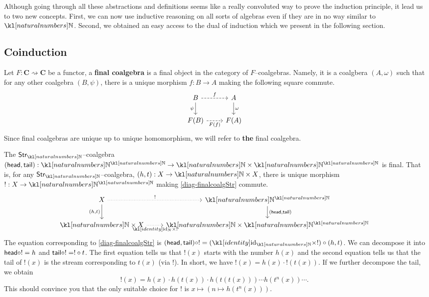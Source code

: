 \documentclass[main.tex]{subfiles}
\begin{document}
Although going through all these abstractions and definitions seems like a really convoluted way to prove the induction principle, it lead us to two new concepts. First, we can now use inductive reasoning on all sorts of algebras even if they are in no way similar to $\N$. Second, we obtained an easy access to the dual of induction which we present in the following section.

\subsection{Coinduction}
\begin{defn}
	Let $F:\mathbf{C}\rightsquigarrow \mathbf{C}$ be a functor, a \textbf{final coalgebra} is a final object in the category of $F$--coalgebras. Namely, it is a coalgbera $(A, \omega)$ such that for any other coalgebra $(B, \psi)$, there is a unique morphism $f: B\rightarrow A$ making the following square commute.
	\begin{equation}\label{diag-fincoalg}
	\centering
	\begin{tikzcd}
	B \arrow[d, "\psi"'] \arrow[r, dashed, "f"] & A \arrow[d, "\omega"] \\
	F(B) \arrow[r, dashed, "F(f)"']                           & F(A)                       
	\end{tikzcd}
    \end{equation}
    Since final coalgebras are unique up to unique homomorphism, we will refer to \textbf{the} final coalgebra.
\end{defn}
\begin{exmp}\label{exmp-finalcoalgStr}
    The $\Str_{\N}$--coalgebra $(\head,\tail): \N^{\N} \rightarrow \N \times \N^{\N}$ is final. That is, for any $\Str_{\N}$--coalgebra, $(h,t): X \rightarrow \N \times X$, there is unique morphism $!:X \rightarrow \N^{\N}$ making \eqref{diag-finalcoalgStr} commute.
    \begin{equation}\label{diag-finalcoalgStr}
        \begin{tikzcd}
            X \arrow[d, "{(h,t)}"'] \arrow[r, "!", dotted]  & \N^{\N} \arrow[d, "{(\head,\tail)}"] \\
            \N\times X \arrow[r, "\id_N \times !"', dotted] & \N \times \N^{\N}                   
        \end{tikzcd}
    \end{equation}
    The equation corresponding to \eqref{diag-finalcoalgStr} is $(\head, \tail) \circ ! = (\id_{\N} \times !) \circ (h,t)$. We can decompose it into $\textsf{head} \circ ! = h$ and $\textsf{tail} \circ ! = ! \circ t$. The first equation tells us that $!(x)$ starts with the number $h(x)$ and the second equation tells us that the tail of $!(x)$ is the stream corresponding to $t(x)$ (via $!$). In short, we have $!(x) = h(x) \cdot !(t(x))$. If we further decompose the tail, we obtain
    \[!(x) = h(x) \cdot h(t(x)) \cdot h(t(t(x))) \cdots h(t^n(x))\cdots.\]
    This should convince you that the only suitable choice for $!$ is $x \mapsto (n \mapsto h(t^n(x)))$.
\end{exmp}
\end{document}
